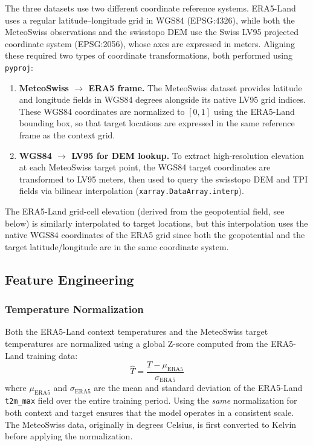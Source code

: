 The three datasets use two different coordinate reference systems. ERA5-Land uses a regular latitude--longitude grid in WGS84 (EPSG:4326), while both the MeteoSwiss observations and the swisstopo DEM use the Swiss LV95 projected coordinate system (EPSG:2056), whose axes are expressed in meters. Aligning these required two types of coordinate transformations, both performed using \texttt{pyproj}:

\begin{enumerate}
    \item \textbf{MeteoSwiss $\rightarrow$ ERA5 frame.} The MeteoSwiss dataset provides latitude and longitude fields in WGS84 degrees alongside its native LV95 grid indices. These WGS84 coordinates are normalized to $[0, 1]$ using the ERA5-Land bounding box, so that target locations are expressed in the same reference frame as the context grid.

    \item \textbf{WGS84 $\rightarrow$ LV95 for DEM lookup.} To extract high-resolution elevation at each MeteoSwiss target point, the WGS84 target coordinates are transformed to LV95 meters, then used to query the swisstopo DEM and TPI fields via bilinear interpolation (\texttt{xarray.DataArray.interp}).
\end{enumerate}

The ERA5-Land grid-cell elevation (derived from the geopotential field, see below) is similarly interpolated to target locations, but this interpolation uses the native WGS84 coordinates of the ERA5 grid since both the geopotential and the target latitude/longitude are in the same coordinate system.

\subsection{Feature Engineering}
\label{sec:feature_engineering_details}

\subsubsection{Temperature Normalization}

Both the ERA5-Land context temperatures and the MeteoSwiss target temperatures are normalized using a global Z-score computed from the ERA5-Land training data:
%
\begin{equation}
    \hat{T} = \frac{T - \mu_{\text{ERA5}}}{\sigma_{\text{ERA5}}}
\end{equation}
%
where $\mu_{\text{ERA5}}$ and $\sigma_{\text{ERA5}}$ are the mean and standard deviation of the ERA5-Land \texttt{t2m\_max} field over the entire training period. Using the \textit{same} normalization for both context and target ensures that the model operates in a consistent scale. The MeteoSwiss data, originally in degrees Celsius, is first converted to Kelvin before applying the normalization.

